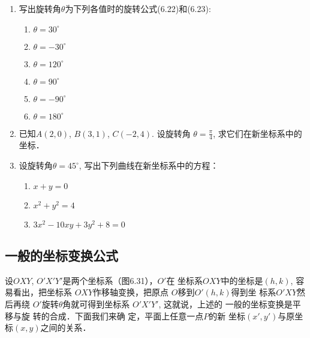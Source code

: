 \begin{ex}
\begin{enumerate}
    \item 写出旋转角$\theta$为下列各值时的旋转公式(6.22)和(6.23): 
\begin{multicols}{3}
\begin{enumerate}
    \item $\theta=30^{\circ}$
    \item $\theta=-30^{\circ}$
    \item $\theta = 120^{\circ}$
    \item $\theta = 90^{\circ}$
    \item $\theta = -90^{\circ}$
    \item $\theta = 180^{\circ}$
\end{enumerate}
\end{multicols}

    \item 已知$A(2,0)$, $B(3,1)$, $C(-2,4)$. 设旋转角
    $\theta = \frac{\pi}{4}$, 
    求它们在新坐标系中的坐标．
    \item 设旋转角$\theta=45^{\circ}$, 写出下列曲线在新坐标系中的方程：
    \begin{multicols}{2}
        \begin{enumerate}
    \item $x+y=0$
\item  $x^2+y^2=4$
\item $3x^2-10xy+3y^2+8=0$
\end{enumerate}
\end{multicols}
\end{enumerate}
\end{ex}

\subsection{一般的坐标变换公式}
设$OXY$, $O'X'Y'$是两个坐标系（图6.31），$O'$在
坐标系$OXY$中的坐标是$(h,k)$, 容易看出，把坐标系
$OXY$作移轴变换，把原点
$O$移到$O'(h,k)$得到坐
标系$O'XY$然后再绕
$O'$旋转$\theta$角就可得到坐标系
$O'X'Y'$, 这就说，上述的
一般的坐标变换是平移与旋
转的合成．下面我们来确
定，平面上任意一点$P$的新
坐标$(x',y')$与原坐标$(x,y)$之间的关系．

\begin{figure}[htp]
    \centering
{}

    \caption{}
\end{figure}


